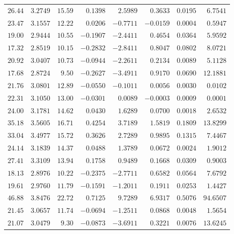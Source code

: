 \begin{tabular}{ccrrrrcr}
$26.44$ & $3.2749$ & $15.59$ & $0.1398$  & $2.5989$  & $0.3633$      & $0.0195$       & $6.7541$  \\
$23.47$ & $3.1557$ & $12.22$ & $0.0206$  & $-0.7711$ & $-0.0159$     & $0.0004$       & $0.5947$  \\
$19.00$ & $2.9444$ & $10.55$ & $-0.1907$ & $-2.4411$ & $0.4654$      & $0.0364$       & $5.9592$  \\
$17.32$ & $2.8519$ & $10.15$ & $-0.2832$ & $-2.8411$ & $0.8047$      & $0.0802$       & $8.0721$  \\
$20.92$ & $3.0407$ & $10.73$ & $-0.0944$ & $-2.2611$ & $0.2134$      & $0.0089$       & $5.1128$  \\
$17.68$ & $2.8724$ & $9.50$  & $-0.2627$ & $-3.4911$ & $0.9170$      & $0.0690$       & $12.1881$ \\
$21.76$ & $3.0801$ & $12.89$ & $-0.0550$ & $-0.1011$ & $0.0056$      & $0.0030$       & $0.0102$  \\
$22.31$ & $3.1050$ & $13.00$ & $-0.0301$ & $0.0089$  & $-0.0003$     & $0.0009$       & $0.0001$  \\
$24.00$ & $3.1781$ & $14.62$ & $0.0430$  & $1.6289$  & $0.0700$      & $0.0018$       & $2.6532$  \\
$35.18$ & $3.5605$ & $16.71$ & $0.4254$  & $3.7189$  & $1.5819$      & $0.1809$       & $13.8299$ \\
$33.04$ & $3.4977$ & $15.72$ & $0.3626$  & $2.7289$  & $0.9895$      & $0.1315$       & $7.4467$  \\
$24.14$ & $3.1839$ & $14.37$ & $0.0488$  & $1.3789$  & $0.0672$      & $0.0024$       & $1.9012$  \\
$27.41$ & $3.3109$ & $13.94$ & $0.1758$  & $0.9489$  & $0.1668$      & $0.0309$       & $0.9003$  \\
$18.13$ & $2.8976$ & $10.22$ & $-0.2375$ & $-2.7711$ & $0.6582$      & $0.0564$       & $7.6792$  \\
$19.61$ & $2.9760$ & $11.79$ & $-0.1591$ & $-1.2011$ & $0.1911$      & $0.0253$       & $1.4427$  \\
$46.88$ & $3.8476$ & $22.72$ & $0.7125$  & $9.7289$  & $6.9317$      & $0.5076$       & $94.6507$ \\
$21.45$ & $3.0657$ & $11.74$ & $-0.0694$ & $-1.2511$ & $0.0868$      & $0.0048$       & $1.5654$  \\
$21.07$ & $3.0479$ & $9.30$  & $-0.0873$ & $-3.6911$ & $0.3221$      & $0.0076$       & $13.6245$ \\\bottomrule
\end{tabular}
